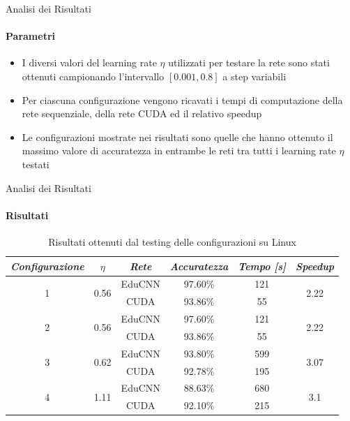 \documentclass[
 ]{beamer}
\begin{document}
\begin{frame}{Analisi dei Risultati}
    \framesubtitle{Parametri}
    \smallskip
    \begin{itemize} [<+->]
        \setlength\itemsep{2.5em}
        \item \large I diversi valori del learning rate $\eta$ utilizzati per testare la rete sono stati ottenuti campionando l'intervallo $[0.001, 0.8]$ a step variabili
        \item \large Per ciascuna configurazione vengono ricavati i tempi di computazione della rete sequenziale, della rete CUDA ed il relativo speedup
        \item \large Le configurazioni mostrate nei risultati sono quelle che hanno ottenuto il massimo valore di accuratezza in entrambe le reti tra tutti i learning rate $\eta$ testati
    \end{itemize}     
\end{frame}

\begin{frame}{Analisi dei Risultati}
    \framesubtitle{Risultati}

        \begin{table}
            \centering
            \renewcommand\arraystretch{1.3}
            \small
            \begin{tabular}{| c | c | c | c | c | c |}
                \hline
                \emph{Configurazione} & $\eta$ & \emph{Rete} & \emph{Accuratezza} & \emph{Tempo [s]} & \emph{Speedup} \\
                \hline
                \multirow{2}{*}{1} & \multirow{2}{*}{0.56} & EduCNN & 97.60\% & 121 & \multirow{2}{*}{2.22} \\ \cline{3-5} 
                                   &                       & CUDA   & 93.86\% & 55  & \\
                \hline
                \multirow{2}{*}{2} & \multirow{2}{*}{0.56} & EduCNN & 97.60\% & 121 & \multirow{2}{*}{2.22} \\ \cline{3-5} 
                                   &                       & CUDA   & 93.86\% & 55  & \\
                \hline
                \multirow{2}{*}{3} & \multirow{2}{*}{0.62} & EduCNN & 93.80\% & 599 & \multirow{2}{*}{3.07} \\ \cline{3-5} 
                                   &                       & CUDA   & 92.78\% & 195  & \\
                \hline
                \multirow{2}{*}{4} & \multirow{2}{*}{1.11} & EduCNN & 88.63\% & 680 & \multirow{2}{*}{3.1} \\ \cline{3-5} 
                                   &                       & CUDA   & 92.10\% & 215  & \\
                \hline
            \end{tabular}
            \caption{Risultati ottenuti dal testing delle configurazioni su Linux}          
        \end{table}    
\end{frame}
\end{document}

